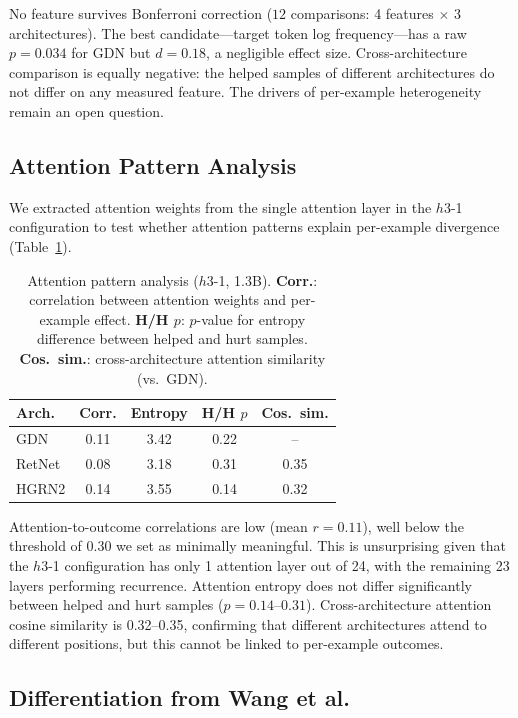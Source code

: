 \documentclass[11pt,a4paper]{article}
\begin{document}
No feature survives Bonferroni correction ($12$ comparisons: 4 features $\times$ 3 architectures).
The best candidate---target token log frequency---has a raw $p = 0.034$ for GDN but $d = 0.18$, a negligible effect size.
Cross-architecture comparison is equally negative: the helped samples of different architectures do not differ on any measured feature.
The drivers of per-example heterogeneity remain an open question.

\subsection{Attention Pattern Analysis}
\label{sec:attention}

We extracted attention weights from the single attention layer in the $h3$-1 configuration to test whether attention patterns explain per-example divergence (Table~\ref{tab:attention}).

\begin{table}[t]
\centering
\small
\begin{tabular}{lcccc}
\toprule
\textbf{Arch.} & \textbf{Corr.} & \textbf{Entropy} & \textbf{H/H $p$} & \textbf{Cos.\ sim.} \\
\midrule
GDN    & 0.11 & 3.42 & 0.22 & -- \\
RetNet & 0.08 & 3.18 & 0.31 & 0.35 \\
HGRN2  & 0.14 & 3.55 & 0.14 & 0.32 \\
\bottomrule
\end{tabular}
\caption{Attention pattern analysis ($h3$-1, 1.3B). \textbf{Corr.}: correlation between attention weights and per-example effect. \textbf{H/H $p$}: $p$-value for entropy difference between helped and hurt samples. \textbf{Cos.\ sim.}: cross-architecture attention similarity (vs.\ GDN).}
\label{tab:attention}
\end{table}

Attention-to-outcome correlations are low (mean $r = 0.11$), well below the threshold of 0.30 we set as minimally meaningful.
This is unsurprising given that the $h3$-1 configuration has only 1 attention layer out of 24, with the remaining 23 layers performing recurrence.
Attention entropy does not differ significantly between helped and hurt samples ($p = 0.14$--$0.31$).
Cross-architecture attention cosine similarity is 0.32--0.35, confirming that different architectures attend to different positions, but this cannot be linked to per-example outcomes.

\subsection{Differentiation from Wang et al.}
\label{sec:wang}
\end{document}
